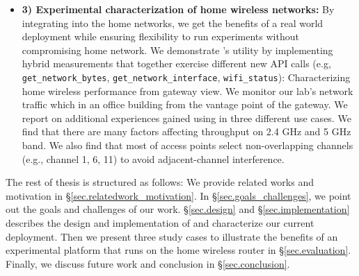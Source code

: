 {\begin{itemize}
\item\textbf{3) Experimental characterization of home wireless networks:} By integrating \sysname into the home networks, we get the benefits of a real world deployment while ensuring flexibility to run experiments without compromising home network. We demonstrate \sysname's utility by implementing hybrid measurements that together exercise different new API calls (e.g, \texttt{get\_network\_bytes}, \texttt{get\_network\_interface}, \texttt{wifi\_status}): Characterizing home wireless performance from gateway view. We monitor our lab's network traffic which in an office building from the vantage point of the gateway. We report on additional experiences gained using \sysname in three different use cases. We find that there are many factors affecting throughput on 2.4 GHz and 5 GHz band. We also find that most of access points select non-overlapping channels (e.g., channel 1, 6, 11) to avoid adjacent-channel interference. 
\end{itemize}
\par}
The rest of thesis is structured as follows: We provide related works and motivation in \S{\ref{sec.relatedwork_motivation}}. In \S{\ref{sec.goals_challenges}}, we point out the goals and challenges of our work. \S{\ref{sec.design}} and \S{\ref{sec.implementation}} describes the design and implementation of \sysname and characterize our current deployment. Then we present three study cases to illustrate the benefits of an experimental platform that runs on the home wireless router in \S{\ref{sec.evaluation}}. Finally, we discuss future work and conclusion in \S{\ref{sec.conclusion}}. 